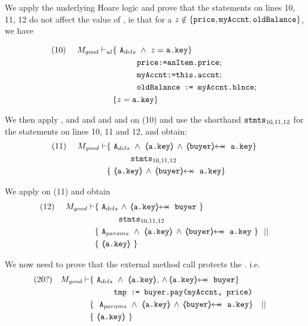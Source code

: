 \begin{proofO}



We apply the underlying Hoare logic and prove that the statements on lines 10, 11, 12 do not affect the value of , ie that for a $z\notin \{ \mbox{\normalfont{\texttt{price}}}, \mbox{\normalfont{\texttt{myAccnt}}}, \mbox{\normalfont{\texttt{oldBalance}}} \}$, we have 

\begin{align*}
\text{(10)}  \ \ \ \ {M_{good} \vdash_{ul}} 
		&	\{  \ \mbox{\normalfont{\texttt{A}}}_{dcls}\  \wedge\ z=\mbox{\normalfont{\texttt{a.key}}} \} \\
		&   ~ \strut \hspace{.9cm} \mbox{\normalfont{\texttt{price:=anItem.price}}}; \\  
		&   ~ \strut \hspace{.9cm} \mbox{\normalfont{\texttt{myAccnt:=this.accnt}}}; \\  
                 &   ~ \strut \hspace{.9cm} \mbox{\normalfont{\texttt{oldBalance := myAccnt.blnce}}};\\
		& \{ z=\mbox{\normalfont{\texttt{a.key}}} \}
\end{align*}

We then apply {}, {} and {} and {} and and {} on (10) and use the shorthand $\mbox{\normalfont{\texttt{stmts}}}_{10,11,12}$ for the statements on lines 10, 11 and 12, and obtain: 
\\
\begin{align*}
\text{(11)}  \ \ \ \ M_{good} \vdash 
		&	\{  \ \Alocals\  \wedge\ {\inside{\prg{a.key}}} \, \wedge\, \protectedFrom{\prg{buyer}} {\prg{a.key}}  \} \\
		& \SPT \stmtsP\ \\  
		& \{ \ {\inside{\prg{a.key}}}  \, \wedge\, \protectedFrom{\prg{buyer}} {\prg{a.key}}   \}
\end{align*}



We apply  {}  on (11) and obtain 
\begin{align*}
\text{(12)}  \ \ \ \ M_{good} \vdash 
		&	\{  \ \Alocals\, \wedge\, \protectedFrom {\prg{a.key}} {\prg{buyer}}\  \} \\
		& \SPT \stmtsP\ \\  
		& \{ \ \Aparams\ \wedge \  {\inside{\prg{a.key}}} \, \wedge\, \protectedFrom{\prg{buyer}} {\prg{a.key}}  \ \} \ \ || \\
		& \{ \ {\inside{\prg{a.key}}}\  \}
\end{align*}


 

We now need to prove that the external method call  protects the . i.e.
\begin{align*}
\text{(20?)} \ \ \ M_{good} \vdash & \{ \ \Alocals \   \wedge\    {\inside{\prg{a.key}}},\, \wedge\, \protectedFrom {\prg{a.key}} {\prg{buyer}}  \} \\
		  		& \SPT  \prg{tmp := buyer.pay(myAccnt, price)}\ \\  
		  		& \{ \ \ \Aparams \ \wedge\ {\inside{\prg{a.key}}} \, \wedge\, \protectedFrom{\prg{buyer}} {\prg{a.key}} \} \ \ \  || \ \ \  \\
		  		&   \{ \   {\inside{\prg{a.key}}}\  \}
\end{align*}
\normalsize


\end{proofO}

